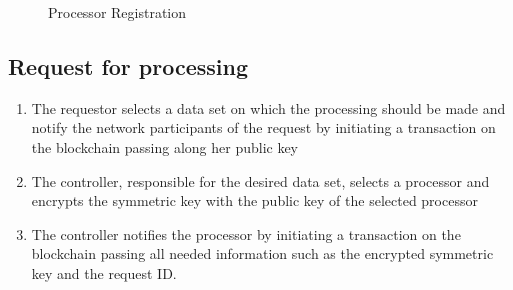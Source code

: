 \begin{figure}[ht!]
  \caption{Processor Registration}
  \label{fig:arch:pr_reg}
\end{figure}

\subsection{Request for processing}
\label{solution:flow:pr_reg}

\begin{enumerate}
  \item The requestor selects a data set on which the processing should be made and  notify the network participants of the request by initiating a transaction on the blockchain passing along her public key
  \item The controller, responsible for the desired data set, selects a processor and encrypts the symmetric key with the public key of the selected processor
  \item The controller notifies the processor by initiating a transaction on the blockchain passing all needed information such as the encrypted symmetric key and the request ID.
\end{enumerate}

